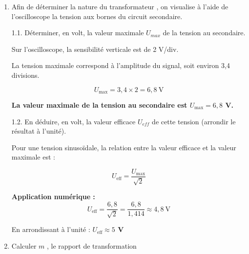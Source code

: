 \documentclass[11pt,a4paper]{article}
\begin{document}
\begin{enumerate}


\item Afin de déterminer la nature du transformateur , on visualise à l'aide de l'oscilloscope la tension aux bornes du circuit secondaire. 

\begin{center}
    
\osci[%
scale=1,
second channel=0,
screen offset one=0,
screen offset two=0,
time div=10,
voltage div one=2,
voltage div two=2,
sample rate=200,
xy mode=0,
func one=6.8*sin(2*180/0.050*x),
func two=3*sin(2*180/0.020*x+180),
color one=D62626,
color two=1053AF,
graph back color=FFFFFF,
info back color=D6D6D6,
info text color=000000,
main axis color=000000,
grid color=CCCCCC
]

\end{center}


    1.1. Déterminer, en volt, la valeur maximale $U_{max}$ de la tension au secondaire. 

\begin{tcolorbox}[colback=red!5!white,colframe=red!75!black]
{\color{blue}
Sur l'oscilloscope, la sensibilité verticale est de 2 V/div.

La tension maximale correspond à l'amplitude du signal, soit environ 3,4 divisions.

$$U_{\max} = 3{,}4 \times 2 = 6{,}8~\text{V}$$

\textbf{La valeur maximale de la tension au secondaire est $U_{\max} = 6{,}8$ V.}
}
\end{tcolorbox}

    1.2. En déduire, en volt, la valeur efficace $U_{eff}$ de cette tension (arrondir le résultat à l'unité). 

\begin{tcolorbox}[colback=red!5!white,colframe=red!75!black]
{\color{blue}
Pour une tension sinusoïdale, la relation entre la valeur efficace et la valeur maximale est :

$$U_{\text{eff}} = \dfrac{U_{\max}}{\sqrt{2}}$$

\textbf{Application numérique :}
$$U_{\text{eff}} = \dfrac{6{,}8}{\sqrt{2}} = \dfrac{6{,}8}{1{,}414} \approx 4{,}8~\text{V}$$

En arrondissant à l'unité : \textbf{$U_{\text{eff}} \approx 5$ V}
}
\end{tcolorbox}

    \item Calculer $m$ , le rapport de transformation 


\end{enumerate}
\end{document}
